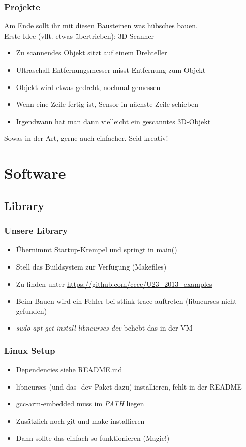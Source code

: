 \documentclass[ngerman,compress]{beamer}
\begin{document}
\begin{frame}
	\frametitle{Projekte}
	Am Ende sollt ihr mit diesen Bausteinen was hübsches bauen. \\
	Erste Idee (vllt. etwas übertrieben): 3D-Scanner
	\begin{itemize}
		\item Zu scannendes Objekt sitzt auf einem Drehteller
		\item Ultraschall-Entfernungsmesser misst Entfernung zum Objekt
		\item Objekt wird etwas gedreht, nochmal gemessen
		\item Wenn eine Zeile fertig ist, Sensor in nächste Zeile schieben
		\item Irgendwann hat man dann vielleicht ein gescanntes 3D-Objekt
	\end{itemize}
	Sowas in der Art, gerne auch einfacher. Seid kreativ!
\end{frame}

\section{Software}

\subsection{Library}

\begin{frame}
	\frametitle{Unsere Library}
	\begin{itemize}
		\item Übernimmt Startup-Krempel und springt in main()
		\item Stell das Buildsystem zur Verfügung (Makefiles)
		\item Zu finden unter \url{https://github.com/cccc/U23_2013_examples}
		\item Beim Bauen wird ein Fehler bei stlink-trace auftreten (libncurses nicht gefunden)
		\item \emph{sudo apt-get install libncurses-dev} behebt das in der VM
	\end{itemize}
\end{frame}

\begin{frame}
	\frametitle{Linux Setup}
	\begin{itemize}
		\item Dependencies siehe README.md
		\item libncurses (und das -dev Paket dazu) installieren, fehlt in der README
		\item gcc-arm-embedded muss im \emph{PATH} liegen
		\item Zusätzlich noch git und make installieren
		\item Dann sollte das einfach so funktionieren (Magie!)
	\end{itemize}
\end{frame}
\end{document}
